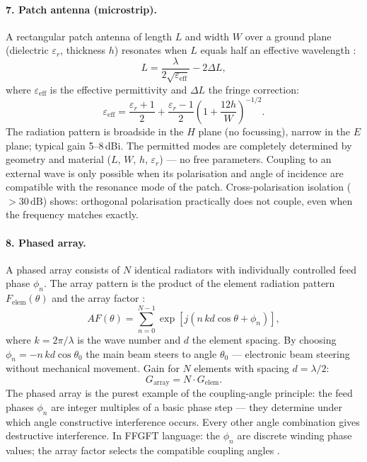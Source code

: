 \paragraph{7. Patch antenna (microstrip).}

A rectangular patch antenna of length $L$ and width $W$ over a ground
plane (dielectric $\varepsilon_r$, thickness $h$) resonates when $L$
equals half an effective wavelength \cite{Pozar2012,Balanis2016}:
\[
  L = \frac{\lambda}{2\sqrt{\varepsilon_\mathrm{eff}}} - 2\Delta L,
\]
where $\varepsilon_\mathrm{eff}$ is the effective permittivity and
$\Delta L$ the fringe correction:
\[
  \varepsilon_\mathrm{eff} = \frac{\varepsilon_r+1}{2}
    + \frac{\varepsilon_r-1}{2}\left(1 + \frac{12h}{W}\right)^{-1/2}.
\]
The radiation pattern is broadside in the $H$ plane (no focussing), narrow
in the $E$ plane; typical gain 5--8\,dBi. The permitted modes are
completely determined by geometry and material ($L$, $W$, $h$,
$\varepsilon_r$) --- no free parameters. Coupling to an external wave is
only possible when its polarisation and angle of incidence are compatible
with the resonance mode of the patch. Cross-polarisation isolation
($> 30\,\mathrm{dB}$) shows: orthogonal polarisation practically does
not couple, even when the frequency matches exactly.

\paragraph{8. Phased array.}

A phased array consists of $N$ identical radiators with individually
controlled feed phase $\phi_n$. The array pattern is the product of the
element radiation pattern $F_\mathrm{elem}(\theta)$ and the array factor
\cite{Mailloux2017,Balanis2016}:
\[
  AF(\theta) = \sum_{n=0}^{N-1} \exp\!\left[j\left(n\,kd\cos\theta + \phi_n\right)\right],
\]
where $k = 2\pi/\lambda$ is the wave number and $d$ the element spacing.
By choosing $\phi_n = -n\,kd\cos\theta_0$ the main beam steers to angle
$\theta_0$ --- electronic beam steering without mechanical movement. Gain
for $N$ elements with spacing $d = \lambda/2$:
\[
  G_\mathrm{array} = N \cdot G_\mathrm{elem}.
\]
The phased array is the purest example of the coupling-angle principle:
the feed phases $\phi_n$ are integer multiples of a basic phase step ---
they determine under which angle constructive interference occurs. Every
other angle combination gives destructive interference. In FFGFT language:
the $\phi_n$ are discrete winding phase values; the array factor selects
the compatible coupling angles \SM.

